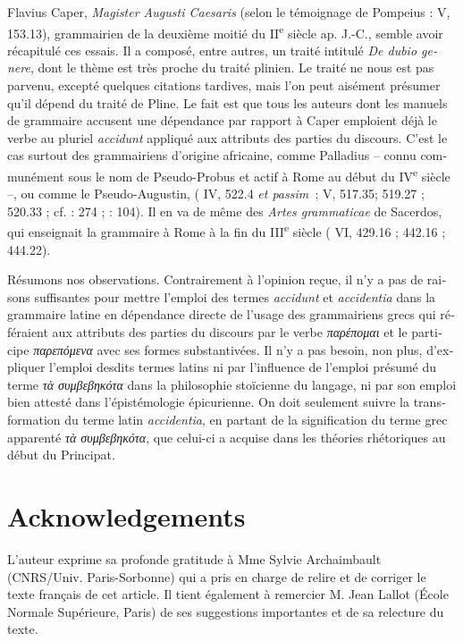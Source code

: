 \documentclass[output=paper]{langsci/langscibook}
\begin{document}
\begin{otherlanguage}{french}
Flavius Caper, \textit{Magister Augusti Caesaris} (selon le témoignage de Pompeius :  V, 153.13), grammairien de la deuxième moitié du II\textsuperscript{e} siècle ap. J.-C., semble avoir récapitulé ces essais. Il a composé, entre autres, un traité intitulé \textit{De dubio genere}, dont le thème est très proche du traité plinien. Le traité ne nous est pas parvenu, excepté quelques citations tardives, mais l’on peut aisément présumer qu’il dépend du traité de Pline. Le fait est que tous les auteurs dont les manuels de grammaire accusent une dépendance par rapport à Caper emploient déjà le verbe au pluriel \textit{accidunt} appliqué aux attributs des parties du discours. C’est le cas surtout des grammairiens d’origine africaine, comme Palladius – connu communément sous le nom de Pseudo-Probus et actif à Rome au début du IV\textsuperscript{e} siècle –, ou comme le Pseudo-Augustin, ( IV, 522.4 \textit{et passim~}; V, 517.35; 519.27 ; 520.33 ; cf. \citealt{basset_ptota_2007}: 274 ; \citeyear{mazhuga_uber_2011}: 104). Il en va de même des \textit{Artes grammaticae} de Sacerdos, qui enseignait la grammaire à Rome à la fin du III\textsuperscript{e} siècle ( VI, 429.16 ; 442.16 ; 444.22).

Résumons nos observations. Contrairement à l’opinion reçue, il n’y a pas de raisons suffisantes pour mettre l’emploi des termes \textit{accidunt} et \textit{accidentia} dans la grammaire latine en dépendance directe de l’usage des grammairiens grecs qui référaient aux attributs des parties du discours par le verbe \textit{παρέπομαι} et le participe \textit{παρεπόμενα} avec ses formes substantivées. Il n’y a pas besoin, non plus, d’expliquer l’emploi desdits termes latins ni par l’influence de l’emploi présumé du terme \textit{τὰ συμβεβηκότα} dans la philosophie stoïcienne du langage, ni par son emploi bien attesté dans l’épistémologie épicurienne. On doit seulement suivre la transformation du terme latin \textit{accidentia}, en partant de la signification du terme grec apparenté \textit{τὰ συμβεβηκότα}, que celui-ci a acquise dans les théories rhétoriques au début du Principat.

\section*{Acknowledgements}
L'auteur exprime sa profonde gratitude à Mme Sylvie Archaimbault (CNRS/Univ. Paris-Sorbonne) qui a pris en charge de relire et de corriger le texte français de cet article. Il tient également à remercier M. Jean Lallot (École Normale Supérieure, Paris) de ses suggestions importantes et de sa relecture du texte.

{\sloppy\printbibliography[heading=subbibliography,notkeyword=this]}
\end{otherlanguage}
\end{document}
